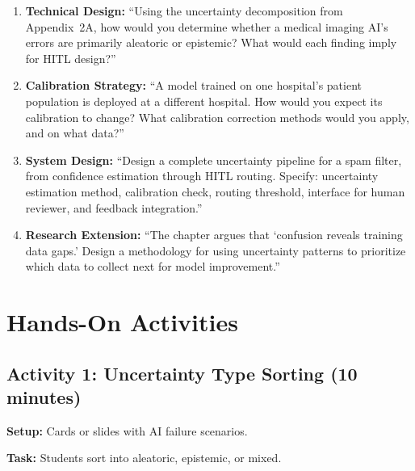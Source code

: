 \begin{enumerate}
    \item \textbf{Technical Design:} ``Using the uncertainty decomposition from Appendix~2A, how would you determine whether a medical imaging AI's errors are primarily aleatoric or epistemic? What would each finding imply for HITL design?''

    \item \textbf{Calibration Strategy:} ``A model trained on one hospital's patient population is deployed at a different hospital. How would you expect its calibration to change? What calibration correction methods would you apply, and on what data?''

    \item \textbf{System Design:} ``Design a complete uncertainty pipeline for a spam filter, from confidence estimation through HITL routing. Specify: uncertainty estimation method, calibration check, routing threshold, interface for human reviewer, and feedback integration.''

    \item \textbf{Research Extension:} ``The chapter argues that `confusion reveals training data gaps.' Design a methodology for using uncertainty patterns to prioritize which data to collect next for model improvement.''
\end{enumerate}

\section{Hands-On Activities}

\subsection{Activity 1: Uncertainty Type Sorting (10 minutes)}

\textbf{Setup:} Cards or slides with AI failure scenarios.

\textbf{Task:} Students sort into aleatoric, epistemic, or mixed.

